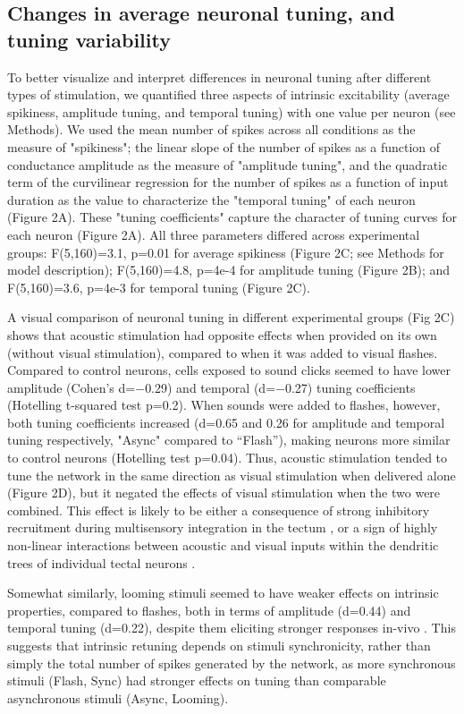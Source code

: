\documentclass{article}
\begin{document}
\subsection*{Changes in average neuronal tuning, and tuning variability}

To better visualize and interpret differences in neuronal tuning after different types of stimulation, we quantified three aspects of intrinsic excitability (average spikiness, amplitude tuning, and temporal tuning) with one value per neuron (see Methods). We used the mean number of spikes across all conditions as the measure of "spikiness"; the linear slope of the number of spikes as a function of conductance amplitude as the measure of "amplitude tuning", and the quadratic term of the curvilinear regression for the number of spikes as a function of input duration as the value to characterize the "temporal tuning" of each neuron (Figure 2A). These "tuning coefficients" capture the character of tuning curves for each neuron (Figure 2A). All three parameters differed across experimental groups: F(5,160)=3.1, p=0.01 for average spikiness (Figure 2C; see Methods for model description); F(5,160)=4.8, p=4e-4 for amplitude tuning (Figure 2B); and F(5,160)=3.6, p=4e-3 for temporal tuning (Figure 2C).

A visual comparison of neuronal tuning in different experimental groups (Fig 2C) shows that acoustic stimulation had opposite effects when provided on its own (without visual stimulation), compared to when it was added to visual flashes. Compared to control neurons, cells exposed to sound clicks seemed to have lower amplitude (Cohen’s d=$-$0.29) and temporal (d=$-$0.27) tuning coefficients (Hotelling t-squared test p=0.2). When sounds were added to flashes, however, both tuning coefficients increased (d=0.65 and 0.26 for amplitude and temporal tuning respectively, "Async" compared to “Flash”), making neurons more similar to control neurons (Hotelling test p=0.04). Thus, acoustic stimulation tended to tune the network in the same direction as visual stimulation when delivered alone (Figure 2D), but it negated the effects of visual stimulation when the two were combined. This effect is likely to be either a consequence of strong inhibitory recruitment during multisensory integration in the tectum \citep{liu2016,hamodi2016}, or a sign of highly non-linear interactions between acoustic and visual inputs within the dendritic trees of individual tectal neurons \citep{deeg2011, felch2016, truszkowski2017}. 

Somewhat similarly, looming stimuli seemed to have weaker effects on intrinsic properties, compared to flashes, both in terms of amplitude (d=0.44) and temporal tuning (d=0.22), despite them eliciting stronger responses in-vivo \citep{khakhalin2014, khakhalin2019graph}. This suggests that intrinsic retuning depends on stimuli synchronicity, rather than simply the total number of spikes generated by the network, as more synchronous stimuli (Flash, Sync) had stronger effects on tuning than comparable asynchronous stimuli (Async, Looming).
\end{document}
